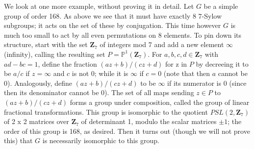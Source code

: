\documentclass[10pt]{article}
\begin{document}
We look at one more example, without proving it in detail. Let $G$ be a
simple group of order 168. As above we see that it must have exactly 8
7-Sylow subgroups; it acts on the set of these by conjugation. This time
however $G$ is much too small to act by all even permutations on 8
elements. To pin down its structure, start with the set $\mathbf{Z}_7$
of integers mod 7 and add a new element $\infty$ (infinity), calling the
resulting set $P=\mathbb P^1(\mathbf{Z}_7)$. For $a,b,c,d\in
\mathbf{Z}_7$ with $ad-bc=1$, define the fraction $(az + b)/(cz + d)$
for z in $P$ by decreeing it to be $a/c$ if $z=\infty$ and $c$ is not 0;
while it is $\infty$ if $c=0$ (note that then $a$ cannot be 0).
Analogously, define $(az+b)/(cz+d)$ to be $\infty$ if its numerator is 0
(since then its denominator cannot be 0). The set of all maps sending
$z\in P$ to $(az+b)/(cz+d)$ forms a group under composition, called the
group of linear fractional transformations. This group is isomorphic to
the quotient $PSL(2,\mathbf{Z}_7)$ of 2 x 2 matrices over $\mathbf{Z}_7$
of determinant 1, modulo the scalar matrices $\pm1$; the order of this
group is 168, as desired. Then it turns out (though we will not prove
this) that $G$ is necessarily isomorphic to this group.
\end{document}
